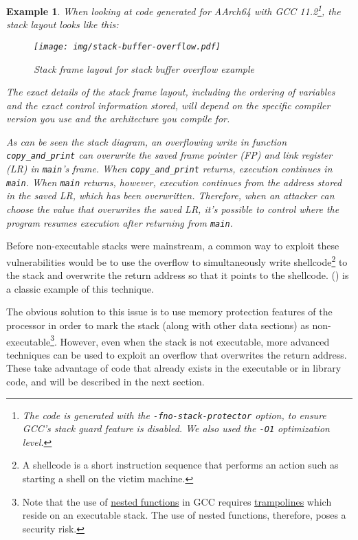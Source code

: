 \documentclass[
  a4paper,
]{report}
\newtheorem{example}{Example}
\begin{document}
\begin{example}
When looking at code generated for AArch64 with GCC 11.2\footnote{The
  code is generated with the \texttt{-fno-stack-protector} option, to
  ensure GCC's stack guard feature is disabled. We also used the
  \texttt{-O1} optimization level.}, the stack layout looks like this:

\begin{figure}
\centering
\texttt{[image: img/stack-buffer-overflow.pdf]}
\caption{Stack frame layout for stack buffer overflow example}
\end{figure}

The exact details of the stack frame layout, including the ordering of
variables and the exact control information stored, will depend on the
specific compiler version you use and the architecture you compile for.

As can be seen the stack diagram, an overflowing write in function
\texttt{copy\_and\_print} can overwrite the saved frame pointer (FP) and
link register (LR) in \texttt{main}'s frame. When
\texttt{copy\_and\_print} returns, execution continues in \texttt{main}.
When \texttt{main} returns, however, execution continues from the
address stored in the saved LR, which has been overwritten. Therefore,
when an attacker can choose the value that overwrites the saved LR, it's
possible to control where the program resumes execution after returning
from \texttt{main}.

\end{example}

Before non-executable stacks were mainstream, a common way to exploit
these vulnerabilities would be to use the overflow to simultaneously
write
\label{__index_entry_11}{shellcode}\footnote{A
  shellcode is a short instruction sequence that performs an action such
  as starting a shell on the victim machine.} to the stack and overwrite
the return address so that it points to the shellcode.
() is a classic example of
this technique.

The obvious solution to this issue is to use memory protection features
of the processor in order to mark the stack (along with other data
sections) as non-executable\footnote{Note that the use of
  \href{https://gcc.gnu.org/onlinedocs/gcc/Nested-Functions.html}{nested
  functions} in GCC requires
  \href{https://gcc.gnu.org/onlinedocs/gccint/Trampolines.html}{trampolines}
  which reside on an executable stack. The use of nested functions,
  therefore, poses a security risk.}. However, even when the stack is
not executable, more advanced techniques can be used to exploit an
overflow that overwrites the return address. These take advantage of
code that already exists in the executable or in library code, and will
be described in the next section.
\end{document}
